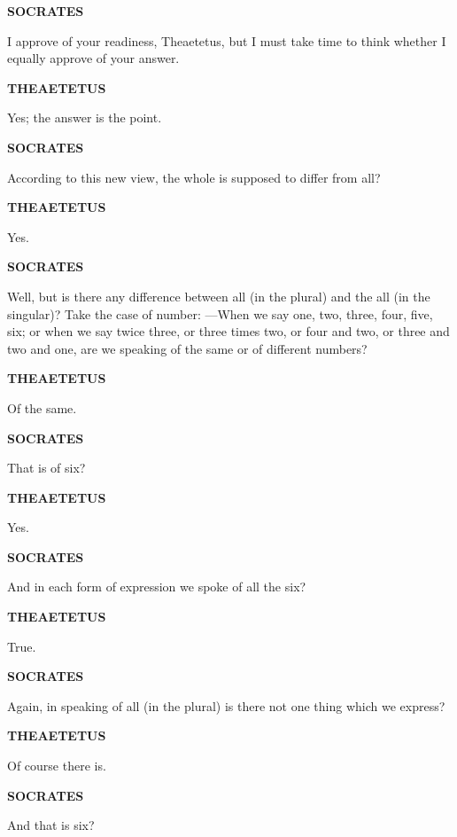 \documentclass[11pt,letter]{article}
\begin{document}
\par \textbf{SOCRATES}
\par   I approve of your readiness, Theaetetus, but I must take time to think whether I equally approve of your answer.

\par \textbf{THEAETETUS}
\par   Yes; the answer is the point.

\par \textbf{SOCRATES}
\par   According to this new view, the whole is supposed to differ from all?

\par \textbf{THEAETETUS}
\par   Yes.

\par \textbf{SOCRATES}
\par   Well, but is there any difference between all (in the plural) and the all (in the singular)? Take the case of number: —When we say one, two, three, four, five, six; or when we say twice three, or three times two, or four and two, or three and two and one, are we speaking of the same or of different numbers?

\par \textbf{THEAETETUS}
\par   Of the same.

\par \textbf{SOCRATES}
\par   That is of six?

\par \textbf{THEAETETUS}
\par   Yes.

\par \textbf{SOCRATES}
\par   And in each form of expression we spoke of all the six?

\par \textbf{THEAETETUS}
\par   True.

\par \textbf{SOCRATES}
\par   Again, in speaking of all (in the plural) is there not one thing which we express?

\par \textbf{THEAETETUS}
\par   Of course there is.

\par \textbf{SOCRATES}
\par   And that is six?
\end{document}
